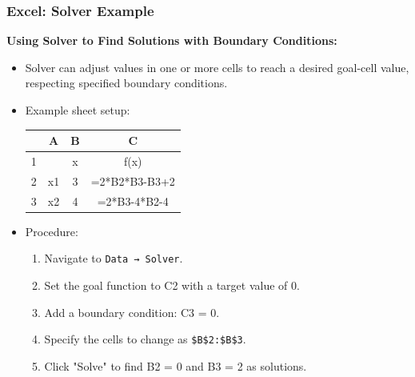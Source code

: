 \begin{frame}[fragile]
  \frametitle{Excel: Solver Example}

  \textbf{Using Solver to Find Solutions with Boundary Conditions:}
  \begin{itemize}
    \item Solver can adjust values in one or more cells to reach a desired goal-cell value, respecting specified boundary conditions.
    \item Example sheet setup:

          \begin{tabular}{|c|c|c|c|}
            \hline
              & A  & B & C             \\
            \hline
            1 &    & x & f(x)          \\
            \hline
            2 & x1 & 3 & =2*B2*B3-B3+2 \\
            \hline
            3 & x2 & 4 & =2*B3-4*B2-4  \\
            \hline
          \end{tabular}

    \item Procedure:
          \begin{enumerate}
            \item Navigate to \texttt{Data → Solver}.
            \item Set the goal function to C2 with a target value of 0.
            \item Add a boundary condition: C3 = 0.
            \item Specify the cells to change as \texttt{\$B\$2:\$B\$3}.
            \item Click "Solve" to find B2 = 0 and B3 = 2 as solutions.
          \end{enumerate}
  \end{itemize}
\end{frame}
